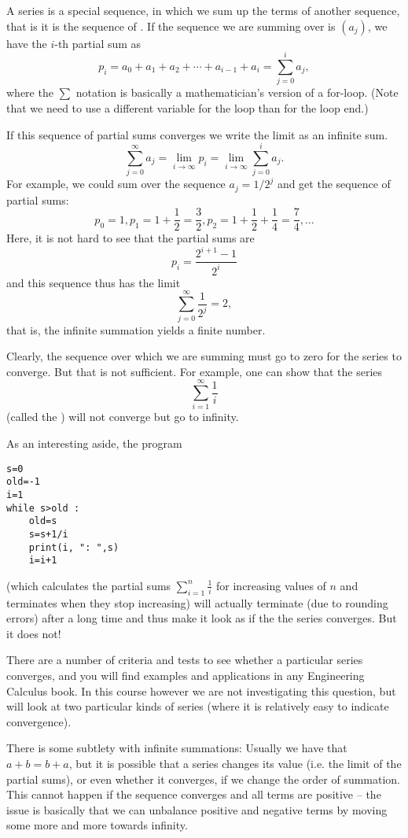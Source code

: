 A series is a special sequence, in which we sum up the terms of another
sequence, that is it is the sequence of .  If the
sequence we are summing over is $(a_j)$, we have the $i$-th partial sum as
\[
p_i=a_0+a_1+a_2+\cdots+a_{i-1}+a_i=\sum_{j=0}^i a_j,
\]
where the $\sum$ notation is basically a mathematician's version of a for-loop.
(Note that we need to use a different variable for the loop than for the loop end.)

If this sequence of partial sums converges we write the limit as an infinite sum.
\[
\sum_{j=0}^\infty a_j=\lim_{i\to\infty} p_i=\lim_{i\to\infty} \sum_{j=0}^i a_j.
\]
For example, we could sum over the
sequence $a_j=1/2^j$ and get the sequence of partial sums:
\[
p_0=1,
p_1=1+\frac{1}{2}=\frac{3}{2},
p_2=1+\frac{1}{2}+\frac{1}{4}=\frac{7}{4}, \ldots
\]
Here, it is not hard to see that the partial sums are
\[
p_i=\frac{2^{i+1}-1}{2^i}
\]
and this sequence thus has the limit
\[
\sum_{j=0}^\infty \frac{1}{2^j}=2,
\]
that is, the infinite summation yields a finite number.
\smallskip

Clearly, the sequence over which we are summing must go to zero for the series to
converge. But that is not sufficient. For example, one can show that the series
\[
\sum_{i=1}^\infty \frac{1}{i}
\]
(called the ) will not converge but go to infinity.

As an interesting aside, the program
\begin{verbatim}
s=0
old=-1
i=1
while s>old :
    old=s
    s=s+1/i
    print(i, ": ",s)
    i=i+1
\end{verbatim}
(which calculates the partial sums $\sum_{i=1}^n \frac{1}{i}$ for increasing
values of $n$ and terminates when they stop increasing) will
actually terminate (due to rounding errors) after a long time and thus
make it look as if the the series converges. But it does not!
\medskip

There are a number of criteria and tests to see whether a particular series converges,
and you will find examples and applications in any Engineering Calculus book. In this
course however we are not investigating this question, but will look at two particular
kinds of series (where it is relatively easy to indicate convergence).

\begin{note}
There is some subtlety with infinite summations: Usually we have that $a+b=b+a$, but it
is possible that a series changes its value (i.e. the limit of the partial sums), or
even whether it converges, if we change the order of summation.
This cannot happen if the sequence converges and all terms are positive -- the issue is
basically that we can unbalance positive and negative terms by moving some more and more
towards infinity.
\end{note}

